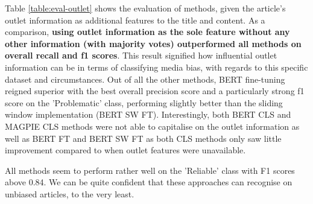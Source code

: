 Table \ref{table:eval-outlet} shows the evaluation of methods, given the article's outlet information as additional features to the title and content. As a comparison, \textbf{using outlet information as the sole feature without any other information (with majority votes) outperformed all methods on overall recall and f1 scores}. This result signified how influential outlet information can be in terms of classifying media bias, with regards to this specific dataset and circumstances. Out of all the other methods, BERT fine-tuning reigned superior with the best overall precision score and a particularly strong f1 score on the 'Problematic' class, performing slightly better than the sliding window implementation (BERT SW FT). Interestingly, both BERT CLS and MAGPIE CLS methods were not able to capitalise on the outlet information as well as BERT FT and BERT SW FT as both CLS methods only saw little improvement compared to when outlet features were unavailable.


All methods seem to perform rather well on the 'Reliable' class with F1 scores above 0.84. We can be quite confident that these approaches can recognise on unbiased articles, to the very least.

